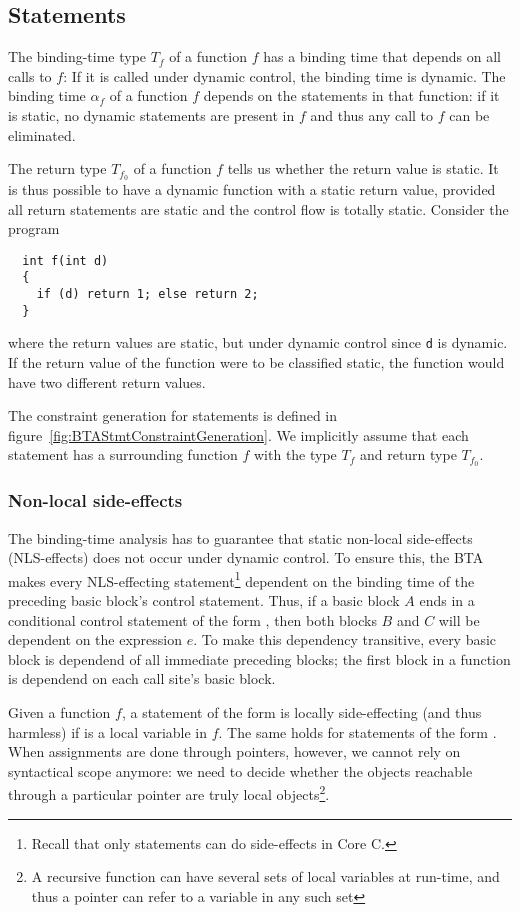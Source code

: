 \begin{docpart}
\subsection{Statements}
The binding-time type $T_f$ of a function $f$ has a binding time that
depends on all calls to $f$: If it is called under dynamic control,
the binding time is dynamic. The binding time $\alpha_f$ of a function
$f$ depends on the statements in that function: if it is static, no
dynamic statements are present in $f$ and thus any call to $f$ can be
eliminated.
  
The return type $T_{f_0}$ of a function $f$ tells us whether the
return value is static. It is thus possible to have a dynamic
function with a static return value, provided all return statements
are static and the control flow is totally static. Consider the
program

\begin{verbatim}
  int f(int d)
  {
    if (d) return 1; else return 2;
  }
\end{verbatim}

\noindent
where the return values are static, but under dynamic control since
\verb.d. is dynamic. If the return value of the function were to be
classified static, the function would have two different return
values. 

The constraint generation for statements is defined in
figure~\ref{fig:BTAStmtConstraintGeneration}. We implicitly assume that
each statement has a surrounding function $f$ with the type $T_f$ and
return type $T_{f_0}$.

\subsubsection{Non-local side-effects}
The binding-time analysis has to guarantee that static non-local
side-effects (NLS-effects) does not occur under dynamic control. To
ensure this, the BTA makes every NLS-effecting
statement\footnote{Recall that only statements can do side-effects in
  Core C.} dependent on the binding time of the preceding basic
block's control statement. Thus, if a basic block $A$ ends in a
conditional control statement of the form , then both blocks $B$ and $C$ will be dependent on
the expression $e$. To make this dependency transitive, every basic
block is dependend of all immediate preceding blocks; the first block
in a function is dependend on each call site's basic block.

Given a function $f$, a statement of the form  is
locally side-effecting (and thus harmless) if  is a local
variable in $f$. The same holds for statements of the form
. When assignments are done through pointers, however,
we cannot rely on syntactical scope anymore: we need to decide whether
the objects reachable through a particular pointer are truly local
objects\footnote{A recursive function can have several sets of local
  variables at run-time, and thus a pointer can refer to a variable in
  any such set}.


\end{docpart}

